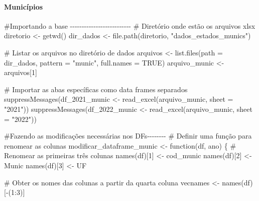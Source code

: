 \documentclass[
  letterpaper,
  DIV=11,
  numbers=noendperiod]{scrartcl}
\let\oldparagraph\paragraph
\renewcommand{\paragraph}[1]{\oldparagraph{#1}\mbox{}}
\newenvironment{Shaded}{\begin{snugshade}}{\end{snugshade}}
\newcommand{\AttributeTok}[1]{\textcolor[rgb]{0.40,0.45,0.13}{#1}}
\newcommand{\CommentTok}[1]{\textcolor[rgb]{0.37,0.37,0.37}{#1}}
\newcommand{\ConstantTok}[1]{\textcolor[rgb]{0.56,0.35,0.01}{#1}}
\newcommand{\ControlFlowTok}[1]{\textcolor[rgb]{0.00,0.23,0.31}{#1}}
\newcommand{\DecValTok}[1]{\textcolor[rgb]{0.68,0.00,0.00}{#1}}
\newcommand{\FunctionTok}[1]{\textcolor[rgb]{0.28,0.35,0.67}{#1}}
\newcommand{\NormalTok}[1]{\textcolor[rgb]{0.00,0.23,0.31}{#1}}
\newcommand{\OtherTok}[1]{\textcolor[rgb]{0.00,0.23,0.31}{#1}}
\newcommand{\SpecialCharTok}[1]{\textcolor[rgb]{0.37,0.37,0.37}{#1}}
\newcommand{\StringTok}[1]{\textcolor[rgb]{0.13,0.47,0.30}{#1}}
\begin{document}
\hypertarget{municuxedpios}{%
\paragraph{Municípios}\label{municuxedpios}}

\begin{Shaded}
\begin{Highlighting}[]
\CommentTok{\#Importando a base {-}{-}{-}{-}{-}{-}{-}{-}{-}{-}{-}{-}{-}{-}{-}{-}{-}{-}{-}{-}{-}{-}{-}{-}{-}{-}}
\CommentTok{\# Diretório onde estão os arquivos xlsx}
\NormalTok{diretorio }\OtherTok{\textless{}{-}} \FunctionTok{getwd}\NormalTok{()}
\NormalTok{dir\_dados }\OtherTok{\textless{}{-}} \FunctionTok{file.path}\NormalTok{(diretorio, }\StringTok{"dados\_estados\_munics"}\NormalTok{)}

\CommentTok{\# Listar os arquivos no diretório de dados}
\NormalTok{arquivos }\OtherTok{\textless{}{-}} \FunctionTok{list.files}\NormalTok{(}\AttributeTok{path =}\NormalTok{ dir\_dados, }\AttributeTok{pattern =} \StringTok{"munic"}\NormalTok{, }\AttributeTok{full.names =} \ConstantTok{TRUE}\NormalTok{)}
\NormalTok{arquivo\_munic }\OtherTok{\textless{}{-}}\NormalTok{ arquivos[}\DecValTok{1}\NormalTok{]}

\CommentTok{\# Importar as abas específicas como data frames separados}
\FunctionTok{suppressMessages}\NormalTok{(df\_2021\_munic }\OtherTok{\textless{}{-}} \FunctionTok{read\_excel}\NormalTok{(arquivo\_munic, }\AttributeTok{sheet =} \StringTok{"2021"}\NormalTok{))}
\FunctionTok{suppressMessages}\NormalTok{(df\_2022\_munic }\OtherTok{\textless{}{-}} \FunctionTok{read\_excel}\NormalTok{(arquivo\_munic, }\AttributeTok{sheet =} \StringTok{"2022"}\NormalTok{))}

\CommentTok{\#Fazendo as modificações necessárias nos DFs{-}{-}{-}{-}{-}{-}{-}{-}}
\CommentTok{\# Definir uma função para renomear as colunas}
\NormalTok{modificar\_dataframe\_munic }\OtherTok{\textless{}{-}} \ControlFlowTok{function}\NormalTok{(df, ano) \{}
  \CommentTok{\# Renomear as primeiras três colunas}
  \FunctionTok{names}\NormalTok{(df)[}\DecValTok{1}\NormalTok{] }\OtherTok{\textless{}{-}} \StringTok{\textquotesingle{}cod\_munic\textquotesingle{}}
  \FunctionTok{names}\NormalTok{(df)[}\DecValTok{2}\NormalTok{] }\OtherTok{\textless{}{-}} \StringTok{\textquotesingle{}Munic\textquotesingle{}}
  \FunctionTok{names}\NormalTok{(df)[}\DecValTok{3}\NormalTok{] }\OtherTok{\textless{}{-}} \StringTok{\textquotesingle{}UF\textquotesingle{}}
  
  \CommentTok{\# Obter os nomes das colunas a partir da quarta coluna}
\NormalTok{  vecnames }\OtherTok{\textless{}{-}} \FunctionTok{names}\NormalTok{(df)[}\SpecialCharTok{{-}}\NormalTok{(}\DecValTok{1}\SpecialCharTok{:}\DecValTok{3}\NormalTok{)]}
  

\end{Highlighting}
\end{Shaded}
\end{document}

